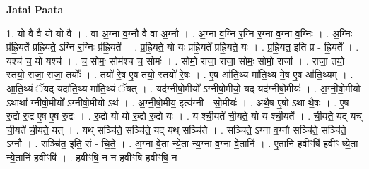 \documentclass[17pt]{extarticle}
\begin{document}
\textbf{Jatai Paata} \newline

1. यो वै वै यो यो वै । . वा अ॒ग्ना व॒ग्नौ वै वा अ॒ग्नौ । . अ॒ग्ना व॒ग्नि र॒ग्नि र॒ग्ना व॒ग्ना व॒ग्निः । . अ॒ग्निः प्र॑ह्रि॒यते᳚ प्रह्रि॒यते॒ ऽग्नि र॒ग्निः प्र॑ह्रि॒यते᳚ । . प्र॒ह्रि॒यते॒ यो यः प्र॑ह्रि॒यते᳚ प्रह्रि॒यते॒ यः । . प्र॒ह्रि॒यत॒ इति॑ प्र - ह्रि॒यते᳚ । . यश्च॑ च॒ यो यश्च॑ । . च॒ सोमः॒ सोम॑श्च च॒ सोमः॑ । . सोमो॒ राजा॒ राजा॒ सोमः॒ सोमो॒ राजा᳚ । . राजा॒ तयो॒ स्तयो॒ राजा॒ राजा॒ तयोः᳚ । . तयो॑ रे॒ष ए॒ष तयो॒ स्तयो॑ रे॒षः । . ए॒ष आ॑ति॒थ्य मा॑ति॒थ्य मे॒ष ए॒ष आ॑ति॒थ्यम् । . आ॒ति॒थ्यं ॅयद् यदा॑ति॒थ्य मा॑ति॒थ्यं ॅयत् । . यद॑ग्नीषो॒मीयो᳚ ऽग्नीषो॒मीयो॒ यद् यद॑ग्नीषो॒मीयः॑ । . अ॒ग्नी॒षो॒मीयो ऽथाथा᳚ ग्नीषो॒मीयो᳚ ऽग्नीषो॒मीयो ऽथ॑ । . अ॒ग्नी॒षो॒मीय॒ इत्य॑ग्नी - सो॒मीयः॑ । . अथै॒ष ए॒षो ऽथा थै॒षः । . ए॒ष रु॒द्रो रु॒द्र ए॒ष ए॒ष रु॒द्रः । . रु॒द्रो यो यो रु॒द्रो रु॒द्रो यः । . य श्ची॒यते॑ ची॒यते॒ यो य श्ची॒यते᳚ । . ची॒यते॒ यद् यच् ची॒यते॑ ची॒यते॒ यत् । . यथ् सञ्चि॑ते॒ सञ्चि॑ते॒ यद् यथ् सञ्चि॑ते । . सञ्चि॑ते॒ ऽग्ना व॒ग्नौ सञ्चि॑ते॒ सञ्चि॑ते॒ ऽग्नौ । . सञ्चि॑त॒ इति॒ सं - चि॒ते॒ । . अ॒ग्ना वे॒ता न्ये॒ता न्य॒ग्ना व॒ग्ना वे॒तानि॑ । . ए॒तानि॑ ह॒वीꣳषि॑ ह॒वीꣳ ष्ये॒ता न्ये॒तानि॑ ह॒वीꣳषि॑ । . ह॒वीꣳषि॒ न न ह॒वीꣳषि॑ ह॒वीꣳषि॒ न । \newline
\end{document}
